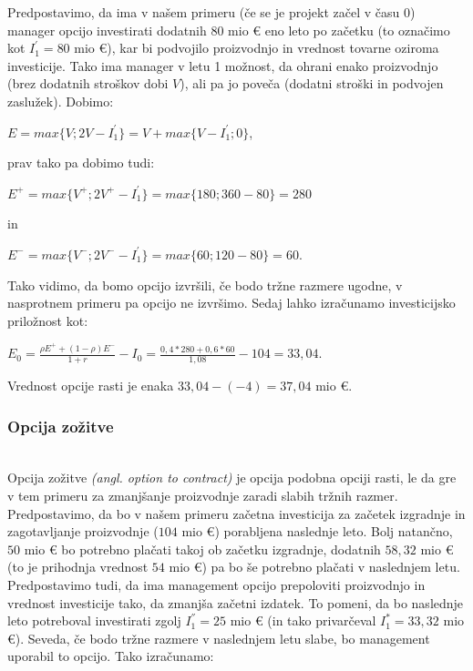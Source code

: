 Predpostavimo, da ima v našem primeru (če se je projekt začel v času 0) manager opcijo investirati dodatnih $80$ mio € eno leto po začetku (to označimo kot $I^'_1 = 80$ mio €), kar bi podvojilo proizvodnjo in vrednost tovarne oziroma investicije. Tako ima manager v letu 1 možnost, da ohrani enako proizvodnjo (brez dodatnih stroškov dobi $V$), ali pa jo poveča (dodatni stroški in podvojen zaslužek). Dobimo:\\

 \begin{center}
$E = max\{V; 2V - I^'_1\} = V + max\{V - I^'_1; 0\}$,
\end{center}
prav tako pa dobimo tudi:\\
\begin{center}
$E^+ = max\{V^+; 2V^+ - I^'_1\} =  max\{180; 360 - 80\} = 280$
\end{center}
in
\begin{center}
$E^- = max\{V^-; 2V^- - I^'_1\} =  max\{60; 120 - 80\} = 60$.
\end{center}

Tako vidimo, da bomo opcijo izvršili, če bodo tržne razmere ugodne, v nasprotnem primeru pa opcijo ne izvršimo. Sedaj lahko izračunamo investicijsko priložnost kot:
\begin{center}
$E_0 = \tfrac{\rho E^+ + (1-\rho)E^-}{1+r} - I_0= \tfrac{0,4 * 280 + 0,6 * 60}{1,08} - 104 = 33,04 $.
\end{center}
Vrednost opcije rasti je enaka $33,04-(-4)=37,04$ mio €.\\

\subsubsection{Opcija zožitve}
\cite[str. 163, 164]{Trigeorgis}\\
Opcija zožitve \textit{(angl. option to contract)} je opcija podobna opciji rasti, le da gre v tem primeru za zmanjšanje proizvodnje zaradi slabih tržnih razmer. \\

Predpostavimo, da bo v našem primeru začetna investicija za začetek izgradnje in zagotavljanje proizvodnje ($104$ mio €) porabljena naslednje leto. Bolj natančno, $50$ mio € bo potrebno plačati takoj ob začetku izgradnje, dodatnih $58,32$ mio € (to je prihodnja vrednost $54$ mio €) pa bo še potrebno plačati v naslednjem letu. Predpostavimo tudi, da ima management opcijo  prepoloviti proizvodnjo in vrednost investicije tako, da zmanjša začetni izdatek. To pomeni, da bo naslednje leto potreboval investirati zgolj $I^{''}_1 = 25$ mio € (in tako privarčeval $I^*_1 = 33,32$ mio €). Seveda, če bodo tržne razmere v naslednjem letu slabe, bo management uporabil to opcijo. Tako izračunamo:\\

